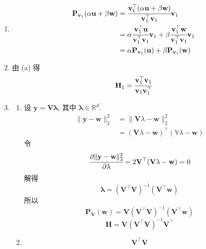 \documentclass[11pt,letter,notitlepage]{article}
\newcommand{\proj}[2]{\textbf{P}_{#2} (#1)}
\begin{document}
\begin{solution}
\begin{enumerate}
\begin{enumerate}
			      \item $$\begin{aligned}
					            \proj{\alpha\mathbf{u}+\beta\mathbf{w}}{\mathbf{v}_1}
					             & =\cfrac{\mathbf{v}_1^\top (\alpha\mathbf{u}+\beta\mathbf{w})}{\mathbf{v}_1^\top \mathbf{v}_1} \mathbf{v}_1 \\
					             & =\alpha \cfrac{\mathbf{v}_1^\top \mathbf{u}}{\mathbf{v}_1^\top \mathbf{v}_1} \mathbf{v}_1
					            +  \beta \cfrac{\mathbf{v}_1^\top \mathbf{w}}{\mathbf{v}_1^\top \mathbf{v}_1} \mathbf{v}_1                    \\
					             & =\alpha\proj{\mathbf{u}}{\mathbf{v}_1} + \beta \proj{\mathbf{w}}{\mathbf{v}_1}
				            \end{aligned}$$
			      \item 由 (a) 得
			            $$\mathbf{H}_1=\cfrac{\mathbf{v}_1^\top \mathbf{v}_1}{\mathbf{v}_1 \mathbf{v}_1^\top}$$
			      \item \begin{enumerate}
				            \item 设 $\mathbf{y}=\mathbf{V}\mathbf{\lambda}$, 其中 $\mathbf{\lambda}\in\mathbb{R}^d$.
				                  $$\begin{aligned}
						                  \| \mathbf{y}-\mathbf{w} \|_2^2
						                   & = \| \mathbf{V}\mathbb{\lambda}-\mathbf{w} \|_2^2                                      \\
						                   & = (\mathbf{V}\mathbb{\lambda}-\mathbf{w})^\top (\mathbb{V}\mathbb{\lambda}-\mathbf{w})
					                  \end{aligned}$$
				                  令
				                  $$\begin{aligned}
						                  \cfrac{\partial \| \mathbf{y}-\mathbf{w} \|_2^2}{\partial\mathbf{\lambda}}
						                  = 2\mathbf{V}^\top (\mathbf{V}\mathbb{\lambda}-\mathbf{w})
						                  =0
					                  \end{aligned}$$
				                  解得
				                  $$\mathbf{\lambda}
					                  =(\mathbf{V}^\top \mathbf{V})^{-1}(\mathbf{V}^\top\mathbf{w})$$
				                  所以
				                  $$\proj{\mathbf{w}}{\mathbf{V}}
					                  =\mathbf{V}(\mathbf{V}^\top \mathbf{V})^{-1}(\mathbf{V}^\top\mathbf{w})$$
				                  $$\mathbf{H}=\mathbf{V}(\mathbf{V}^\top \mathbf{V})^{-1}\mathbf{V}^\top$$
				            \item $$\mathbf{V}^\top \mathbf{V}
$$
\end{enumerate}
\end{enumerate}
\end{enumerate}
\end{solution}
\end{document}
